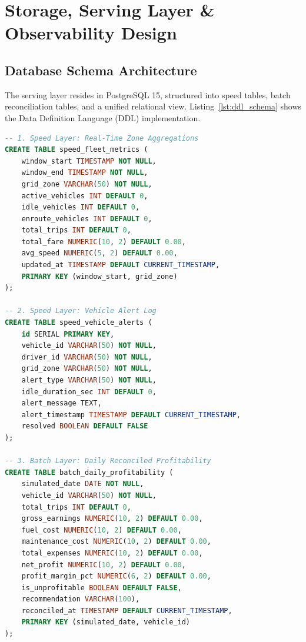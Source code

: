 \documentclass[11pt,a4paper]{article}
\begin{document}
\clearpage
\section{Storage, Serving Layer \& Observability Design}
\subsection{Database Schema Architecture}
The serving layer resides in PostgreSQL 15, structured into speed tables, batch reconciliation tables, and a unified relational view. Listing~\ref{lst:ddl_schema} shows the Data Definition Language (DDL) implementation.

\begin{lstlisting}[language=SQL, caption={Serving Layer PostgreSQL DDL Schema}, label={lst:ddl_schema}]
-- 1. Speed Layer: Real-Time Zone Aggregations
CREATE TABLE speed_fleet_metrics (
    window_start TIMESTAMP NOT NULL,
    window_end TIMESTAMP NOT NULL,
    grid_zone VARCHAR(50) NOT NULL,
    active_vehicles INT DEFAULT 0,
    idle_vehicles INT DEFAULT 0,
    enroute_vehicles INT DEFAULT 0,
    total_trips INT DEFAULT 0,
    total_fare NUMERIC(10, 2) DEFAULT 0.00,
    avg_speed NUMERIC(5, 2) DEFAULT 0.00,
    updated_at TIMESTAMP DEFAULT CURRENT_TIMESTAMP,
    PRIMARY KEY (window_start, grid_zone)
);

-- 2. Speed Layer: Vehicle Alert Log
CREATE TABLE speed_vehicle_alerts (
    id SERIAL PRIMARY KEY,
    vehicle_id VARCHAR(50) NOT NULL,
    driver_id VARCHAR(50) NOT NULL,
    grid_zone VARCHAR(50) NOT NULL,
    alert_type VARCHAR(50) NOT NULL,
    idle_duration_sec INT DEFAULT 0,
    alert_message TEXT,
    alert_timestamp TIMESTAMP DEFAULT CURRENT_TIMESTAMP,
    resolved BOOLEAN DEFAULT FALSE
);

-- 3. Batch Layer: Daily Reconciled Profitability
CREATE TABLE batch_daily_profitability (
    simulated_date DATE NOT NULL,
    vehicle_id VARCHAR(50) NOT NULL,
    total_trips INT DEFAULT 0,
    gross_earnings NUMERIC(10, 2) DEFAULT 0.00,
    fuel_cost NUMERIC(10, 2) DEFAULT 0.00,
    maintenance_cost NUMERIC(10, 2) DEFAULT 0.00,
    total_expenses NUMERIC(10, 2) DEFAULT 0.00,
    net_profit NUMERIC(10, 2) DEFAULT 0.00,
    profit_margin_pct NUMERIC(6, 2) DEFAULT 0.00,
    is_unprofitable BOOLEAN DEFAULT FALSE,
    recommendation VARCHAR(100),
    reconciled_at TIMESTAMP DEFAULT CURRENT_TIMESTAMP,
    PRIMARY KEY (simulated_date, vehicle_id)
);
\end{lstlisting}
\end{document}
